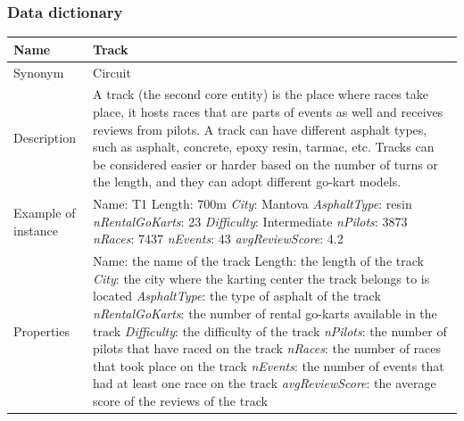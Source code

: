 \documentclass{beamer}
\begin{document}
\begin{frame}
\frametitle{Data dictionary}
\begin{table}
\tiny
\begin{tabular}{|p{2cm}|p{6cm}|}
\hline
Name & \textbf{Track} \\
\hline
Synonym & Circuit \\
\hline
Description & A track (the second core entity) is the place where races
take place, it hosts races that are parts of events as well 
and receives reviews from pilots. 
A track can have different asphalt types, such as asphalt,
concrete, epoxy resin, tarmac, etc. Tracks can be considered
easier or harder based on the number of turns or the length,
and they can adopt different go-kart models. \\
\hline
Example of instance &
Name: T1 \newline
Length: 700m \newline
\textit{City}: Mantova \newline
\textit{AsphaltType}: resin \newline
\textit{nRentalGoKarts}: 23 \newline
\textit{Difficulty}: Intermediate \newline
\textit{nPilots}: 3873 \newline
\textit{nRaces}: 7437 \newline
\textit{nEvents}: 43 \newline
\textit{avgReviewScore}: 4.2 \\
\hline
Properties &
Name: the name of the track \newline
Length: the length of the track \newline
\textit{City}: the city where the karting center the track belongs to is located \newline
\textit{AsphaltType}: the type of asphalt of the track \newline
\textit{nRentalGoKarts}: the number of rental go-karts available in the track \newline
\textit{Difficulty}: the difficulty of the track \newline
\textit{nPilots}: the number of pilots that have raced on the track \newline
\textit{nRaces}: the number of races that took place on the track \newline
\textit{nEvents}: the number of events that had at least one race on the track \newline
\textit{avgReviewScore}: the average score of the reviews of the track \\
\hline
\end{tabular}
\end{table}
\end{frame}
\end{document}
